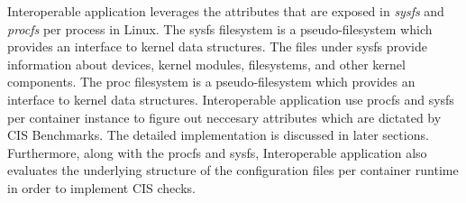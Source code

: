 Interoperable application leverages the attributes that are exposed in \textit{sysfs} and \textit{procfs} per process in Linux. The sysfs filesystem is a pseudo-filesystem which provides an
interface to kernel data structures. The files under sysfs provide
information about devices, kernel modules, filesystems, and other
kernel components. The proc filesystem is a pseudo-filesystem which provides an
interface to kernel data structures. Interoperable application use procfs and sysfs per container instance to figure out neccesary attributes which are dictated by CIS Benchmarks. The detailed implementation is discussed in later sections. 
Furthermore, along with the procfs and sysfs, Interoperable application also evaluates the underlying structure of the configuration files per container runtime in order to implement CIS checks.

